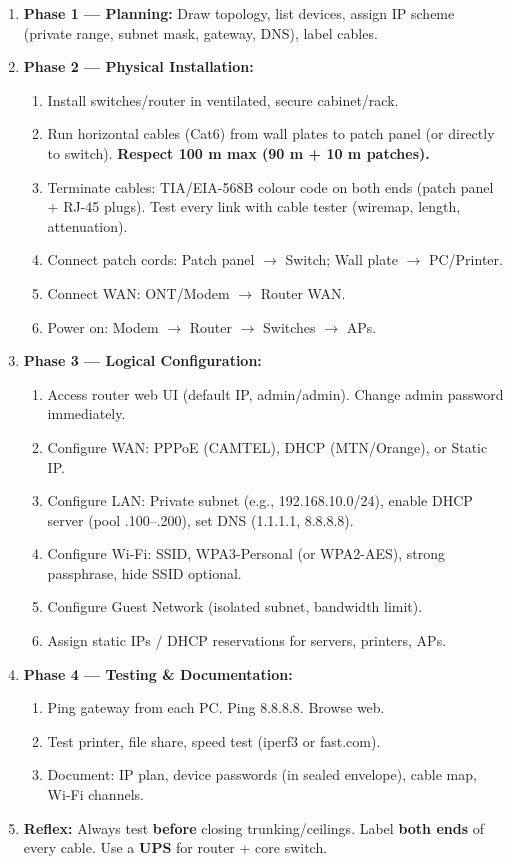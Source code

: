 \documentclass[11pt]{article}
\begin{document}
\begin{methode}
\begin{enumerate}
\item \textbf{Phase 1 — Planning:} Draw topology, list devices, assign IP scheme (private range, subnet mask, gateway, DNS), label cables.
\item \textbf{Phase 2 — Physical Installation:}
      \begin{enumerate}
      \item Install switches/router in ventilated, secure cabinet/rack.
      \item Run horizontal cables (Cat6) from wall plates to patch panel (or directly to switch). \textbf{Respect 100 m max (90 m + 10 m patches).}
      \item Terminate cables: TIA/EIA-568B colour code on both ends (patch panel + RJ-45 plugs). Test every link with cable tester (wiremap, length, attenuation).
      \item Connect patch cords: Patch panel $\rightarrow$ Switch; Wall plate $\rightarrow$ PC/Printer.
      \item Connect WAN: ONT/Modem $\rightarrow$ Router WAN.
      \item Power on: Modem $\rightarrow$ Router $\rightarrow$ Switches $\rightarrow$ APs.
      \end{enumerate}
\item \textbf{Phase 3 — Logical Configuration:}
      \begin{enumerate}
      \item Access router web UI (default IP, admin/admin). Change admin password immediately.
      \item Configure WAN: PPPoE (CAMTEL), DHCP (MTN/Orange), or Static IP.
      \item Configure LAN: Private subnet (e.g., 192.168.10.0/24), enable DHCP server (pool .100–.200), set DNS (1.1.1.1, 8.8.8.8).
      \item Configure Wi-Fi: SSID, WPA3-Personal (or WPA2-AES), strong passphrase, hide SSID optional.
      \item Configure Guest Network (isolated subnet, bandwidth limit).
      \item Assign static IPs / DHCP reservations for servers, printers, APs.
      \end{enumerate}
\item \textbf{Phase 4 — Testing \& Documentation:}
      \begin{enumerate}
      \item Ping gateway from each PC. Ping 8.8.8.8. Browse web.
      \item Test printer, file share, speed test (iperf3 or fast.com).
      \item Document: IP plan, device passwords (in sealed envelope), cable map, Wi-Fi channels.
      \end{enumerate}
\item \textbf{Reflex:} Always test \textbf{before} closing trunking/ceilings. Label \textbf{both ends} of every cable. Use a \textbf{UPS} for router + core switch.
\end{enumerate}
\end{methode}
\end{document}
